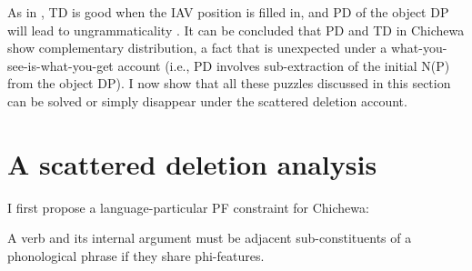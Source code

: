 \documentclass[output=paper,colorlinks,citecolor=brown
]{langscibook}
\begin{document}
\ea\label{ex:chen:IAV}
\begin{xlist}
  \label{ex:chen:IAVbasic}
  
  \label{ex:chen:IAVgood}

  \label{ex:chen:IAVbad}
  
\end{xlist}
\z

 As in , TD is good when the IAV position is filled in, and PD of the object DP will lead to ungrammaticality . It can be concluded that PD and TD in Chichewa show complementary distribution, a fact that is unexpected under a what-you-see-is-what-you-get account (i.e., PD involves sub-extraction of the initial N(P) from the object DP). I now show that all these puzzles discussed in this section can be solved or simply disappear under the scattered deletion account.

\section{A scattered deletion analysis}\label{sec:chen:3}

I first propose a language-particular PF constraint  for Chichewa:

\ea\label{ex:chen:Constraint}
A verb and its internal argument must be adjacent sub-constituents of a phonological phrase if they share phi-features.
\z
\end{document}
